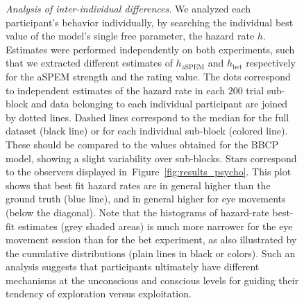 \documentclass[12pt,english]{article}%
\newcommand{\seeFig}[1]{Figure~\ref{fig:#1}}
\begin{document}
\begin{figure}%
\caption{\emph{Analysis of inter-individual differences.} %
We analyzed each participant's behavior individually, by searching
the individual best value of the model's single free parameter, the hazard rate $h$.
Estimates were performed independently on both experiments,
such that we extracted different estimates of $h_{\text{aSPEM}}$ and $h_{\text{bet}}$
respectively for the aSPEM strength and the rating value. 
The dots correspond to independent estimates of the hazard rate in each $200$ trial sub-block and data belonging to
each individual participant are joined by dotted lines.
Dashed lines correspond to the median for the full dataset (black line) 
or for each individual sub-block (colored line). 
These should be compared to the values obtained for the BBCP model,
showing a slight variability over sub-blocks.
Stars correspond to the observers displayed in~\seeFig{results_psycho}.
This plot shows that best fit hazard rates are in general higher than the ground truth (blue line), 
and in general higher for eye movements (below the diagonal).
Note that the histograms of hazard-rate best-fit estimates (grey shaded areas) is much more narrower 
for the eye movement session than for the bet experiment,
as also illustrated by the cumulative distributions (plain lines in black or colors).
Such an analysis suggests that participants ultimately have
different mechanisms at the unconscious and conscious levels
for guiding their tendency of exploration versus exploitation.
 }
\label{fig:results_inter}
\end{figure}
\end{document}
